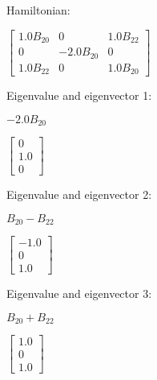 \documentclass[8pt]{report}
\begin{document}
Hamiltonian:

\begin{math}
\left[\begin{matrix}1.0 B_{20} & 0 & 1.0 B_{22}\\0 & - 2.0 B_{20} & 0\\1.0 B_{22} & 0 & 1.0 B_{20}\end{matrix}\right]
\end{math}

Eigenvalue and eigenvector 1:

\begin{math}
- 2.0 B_{20}
\end{math}

\begin{math}
\left[\begin{matrix}0\\1.0\\0\end{matrix}\right]
\end{math}

Eigenvalue and eigenvector 2:

\begin{math}
B_{20} - B_{22}
\end{math}

\begin{math}
\left[\begin{matrix}-1.0\\0\\1.0\end{matrix}\right]
\end{math}

Eigenvalue and eigenvector 3:

\begin{math}
B_{20} + B_{22}
\end{math}

\begin{math}
\left[\begin{matrix}1.0\\0\\1.0\end{matrix}\right]
\end{math}
\end{document}

